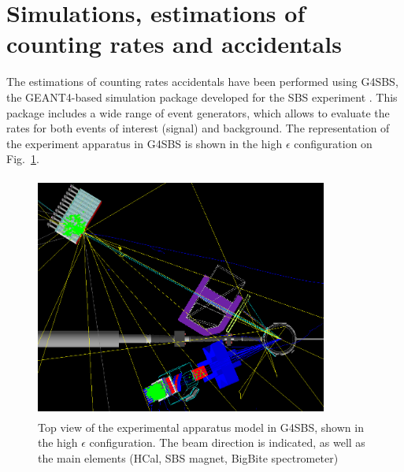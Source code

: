 
\section{Simulations, estimations of counting rates and accidentals}
\label{sec:simu}

The estimations of counting rates accidentals have been performed using G4SBS, the GEANT4-based simulation package developed for the SBS experiment \cite{g4sbs}.
This package includes a wide range of event generators, which allows to evaluate the rates for both events of interest (signal) and background.
The representation of the experiment apparatus in G4SBS is shown in the high $\epsilon$ configuration on Fig.~\ref{fig:g4sbssetup}. 
%
\begin{figure}[!h]
  \centering
    \includegraphics[width=9.6cm,height=8cm]{Plots/SetupHiEPoint.png}
    \caption{Top view of the experimental apparatus model in G4SBS, shown in the high $\epsilon$ configuration. The beam direction is indicated, as well as the main elements (HCal, SBS magnet, BigBite spectrometer)}
    \label{fig:g4sbssetup}
\end{figure}
%

